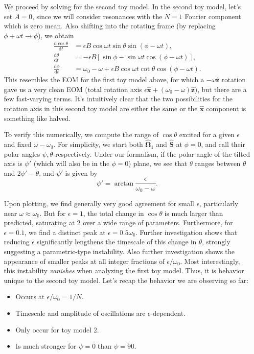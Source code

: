 \documentclass[11pt,
        usenames, %
        dvipsnames %
    ]{article}
\newcommand*{\rd}[2]{\frac{\mathrm{d}#1}{\mathrm{d}#2}}
\newcommand*{\bm}[1]{\boldsymbol{\mathbf{#1}}}
\newcommand*{\uv}[1]{\hat{\bm{#1}}}
\newcommand*{\p}[1]{\left(#1\right)}
\newcommand*{\s}[1]{\left[#1\right]}
\begin{document}
We proceed by solving for the second toy model. In the second toy model, let's
set $A = 0$, since we will consider resonances with the $N = 1$ Fourier
component which is zero mean. Also shifting into the rotating frame (by
replacing $\phi + \omega t \to \phi$), we obtain
\begin{subequations}
    \begin{align}
        \rd{\cos \theta}{t} &= \epsilon B\cos \omega t
                \sin \theta \sin\p{\phi - \omega t},\\
        \rd{\theta}{t} &= -\epsilon B \s{
            \sin \phi - \sin \omega t \cos\p{\phi - \omega t}},\\
        \rd{\phi}{t} &= \omega_0 - \omega + \epsilon B\cos \omega t \cot \theta
            \cos\p{\phi - \omega t}.
    \end{align}
\end{subequations}
This resembles the EOM for the first toy model above, for which a $-\omega
\uv{z}$ rotation gave us a very clean EOM (total rotation axis $\epsilon \uv{x}
+ \p{\omega_0 - \omega}\uv{z}$), but there are a few fast-varying terms. It's
intuitively clear that the two possibilities for the rotation axis in this
second toy model are either the same or the $\uv{x}$ component is something like
halved.

To verify this numerically, we compute the range of $\cos \theta$ excited for a
given $\epsilon$ and fixed $\omega - \omega_0$. For simplicity, we start both
$\uv{\Omega}_1$ and $\uv{S}$ at $\phi = 0$, and call their polar angles $\psi,
\theta$ respectively. Under our formalism, if the polar angle of the tilted axis
is $\psi'$ (which will also be in the $\phi = 0$) plane, we see that $\theta$
ranges between $\theta$ and $2\psi' - \theta$, and $\psi'$ is given by
\begin{equation}
    \psi' = \arctan \frac{\epsilon}{\omega_0 - \omega}.
\end{equation}

Upon plotting, we find generally very good agreement for small $\epsilon$,
particularly near $\omega \approx \omega_0$. But for $\epsilon = 1$, the total
change in $\cos \theta$ is much larger than predicted, saturating at $2$ over a
wide range of parameters. Furthermore, for $\epsilon = 0.1$, we find a distinct
peak at $\epsilon = 0.5\omega_0$. Further investigation shows that reducing
$\epsilon$ significantly lengthens the timescale of this change in $\theta$,
strongly suggesting a parametric-type instability. Also further investigation
shows the appearance of smaller peaks at all integer fractions of $\epsilon /
\omega_0$. Most interestingly, this instability \emph{vanishes} when analyzing
the first toy model. Thus, it is behavior unique to the second toy model. Let's
recap the behavior we are observing so far:
\begin{itemize}
    \item Occurs at $\epsilon / \omega_0 = 1 / N$.
    \item Timescale and amplitude of oscillations are $\epsilon$-dependent.
    \item Only occur for toy model 2.
    \item Is much stronger for $\psi = 0$ than $\psi = 90$.
\end{itemize}
\end{document}

